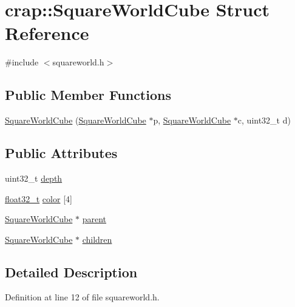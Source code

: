 \hypertarget{structcrap_1_1_square_world_cube}{}\section{crap\+:\+:Square\+World\+Cube Struct Reference}
\label{structcrap_1_1_square_world_cube}


{\ttfamily \#include $<$squareworld.\+h$>$}

\subsection*{Public Member Functions}
\begin{DoxyCompactItemize}
\item 
\hyperlink{structcrap_1_1_square_world_cube_ae8060c3287dfb9ace41ca0c6903a1670}{Square\+World\+Cube} (\hyperlink{structcrap_1_1_square_world_cube}{Square\+World\+Cube} $\ast$p, \hyperlink{structcrap_1_1_square_world_cube}{Square\+World\+Cube} $\ast$c, uint32\+\_\+t d)
\end{DoxyCompactItemize}
\subsection*{Public Attributes}
\begin{DoxyCompactItemize}
\item 
uint32\+\_\+t \hyperlink{structcrap_1_1_square_world_cube_ace5f01b725ba2900714f1114e8d58ccf}{depth}
\item 
\hyperlink{crap__types_8h_a4611b605e45ab401f02cab15c5e38715}{float32\+\_\+t} \hyperlink{structcrap_1_1_square_world_cube_a40225fc4b5138dcb9b0fe58c882774c0}{color} \mbox{[}4\mbox{]}
\item 
\hyperlink{structcrap_1_1_square_world_cube}{Square\+World\+Cube} $\ast$ \hyperlink{structcrap_1_1_square_world_cube_adf6b00d13203e191b4056f3e64f51582}{parent}
\item 
\hyperlink{structcrap_1_1_square_world_cube}{Square\+World\+Cube} $\ast$ \hyperlink{structcrap_1_1_square_world_cube_acf9b60edb49483c7b5e7cd80fb35668a}{children}
\end{DoxyCompactItemize}


\subsection{Detailed Description}


Definition at line 12 of file squareworld.\+h.



